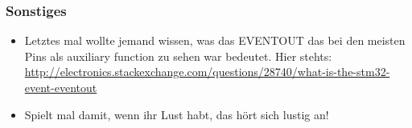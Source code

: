 \documentclass[ngerman,compress]{beamer}
\begin{document}
\begin{frame}
	\frametitle{Sonstiges}
	\begin{itemize}
		\item Letztes mal wollte jemand wissen, was das EVENTOUT das bei den meisten Pins als auxiliary function zu sehen war bedeutet. Hier stehts: \url{http://electronics.stackexchange.com/questions/28740/what-is-the-stm32-event-eventout}
		\item Spielt mal damit, wenn ihr Lust habt, das hört sich lustig an!
	\end{itemize}
\end{frame}
\end{document}

